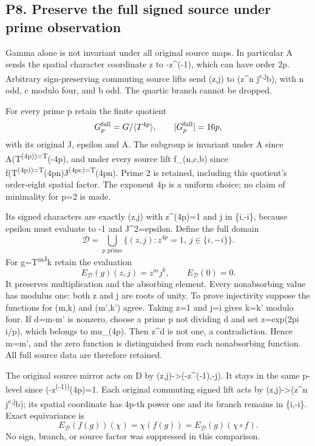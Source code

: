 \documentclass[
  11pt,
]{article}
\begin{document}
\subsection{P8. Preserve the full signed source under prime
observation}\label{p8.-preserve-the-full-signed-source-under-prime-observation}

Gamma alone is not invariant under all original source maps. In
particular A sends the spatial character coordinate z to -z\^{}(-1),
which can have order 2p. Arbitrary sign-preserving commuting source
lifts send (z,j) to (z\^{}n j\textsuperscript{c,j}b), with n odd, c
modulo four, and b odd. The quartic branch cannot be dropped.

For every prime p retain the finite quotient \[
G_p^{\rm full}=G/\langle T^{4p}\rangle,
\qquad |G_p^{\rm full}|=16p,
\] with its original J, epsilon and A. The subgroup is invariant under A
since A(T\textsuperscript{(4p))=T}(-4p), and under every source lift
f\_(n,c,b) since
f(T\textsuperscript{(4p))=T}(4pn)J\textsuperscript{(4pc)=T}(4pn). Prime
2 is retained, including this quotient's order-eight spatial factor. The
exponent 4p is a uniform choice; no claim of minimality for p=2 is made.

Its signed characters are exactly (z,j) with z\^{}(4p)=1 and j in
\{i,-i\}, because epsilon must evaluate to -1 and J\^{}2=epsilon. Define
the full domain \[
\mathcal D=\bigcup_{p\text{ prime}}\{(z,j):z^{4p}=1,\ j\in\{i,-i\}\}.
\] For g=T\textsuperscript{mJ}k retain the evaluation \[
E_{\mathcal D}(g)(z,j)=z^m j^k,
\qquad E_{\mathcal D}(0)=0.
\] It preserves multiplication and the absorbing element. Every
nonabsorbing value has modulus one: both z and j are roots of unity. To
prove injectivity suppose the functions for (m,k) and (m',k') agree.
Taking z=1 and j=i gives k=k' modulo four. If d=m-m' is nonzero, choose
a prime p not dividing d and set z=exp(2pi i/p), which belongs to
mu\_(4p). Then z\^{}d is not one, a contradiction. Hence m=m', and the
zero function is distinguished from each nonabsorbing function. All full
source data are therefore retained.

The original source mirror acts on D by
(z,j)-\textgreater(-z\^{}(-1),-j). It stays in the same p-level since
(-z\textsuperscript{(-1))}(4p)=1. Each original commuting signed lift
acts by (z,j)-\textgreater(z\^{}n j\textsuperscript{c,j}b); its spatial
coordinate has 4p-th power one and its branch remains in \{i,-i\}. Exact
equivariance is \[
E_{\mathcal D}(f(g))(\chi)=\chi(f(g))=E_{\mathcal D}(g)(\chi\circ f).
\] No sign, branch, or source factor was suppressed in this comparison.
\end{document}
